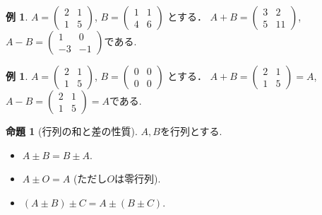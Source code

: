 \documentclass[dvipdfmx,a4paper,11pt]{article}
\theoremstyle{definition}
\newtheorem{prop}[thm]{命題}
\newtheorem{exa}[thm]{例}
\begin{document}
\begin{exa}
 $A = 
 \begin{pmatrix}
 2&1 \\
 1&5
 \end{pmatrix}
 $, 
 $
 B = 
 \begin{pmatrix}
 1&1\\
 4&6
 \end{pmatrix}
 $
 とする．
$
 A+B =
 \begin{pmatrix}
 3&2 \\
5&11
 \end{pmatrix}
 $, 
 $
  A-B =
 \begin{pmatrix}
 1&0\\
 -3&-1
 \end{pmatrix}
 $である.
 \end{exa}
 
 \begin{exa}
 $A = 
 \begin{pmatrix}
 2&1 \\
 1&5
 \end{pmatrix}
 $, 
 $
 B = 
 \begin{pmatrix}
 0&0\\
 0&0
 \end{pmatrix}
 $
 とする． 
$
 A+B =
 \begin{pmatrix}
 2&1 \\
 1&5
 \end{pmatrix}
 =A
 $, 
 $
  A-B =
 \begin{pmatrix}
 2&1 \\
 1&5
 \end{pmatrix}
 =
 A
 $である.
 \end{exa}


 
 \begin{tcolorbox}[
    colback = white,
    colframe = green!35!black,
    fonttitle = \bfseries,
    breakable = true]
    \begin{prop}[行列の和と差の性質]
$A, B$を行列とする.
 \begin{itemize}
 	\setlength{\parskip}{0cm}
  	\setlength{\itemsep}{0pt} 
 \item $A\pm B =B\pm A$.
  \item $A\pm O =A$ (ただし$O$は零行列).
  \item $(A \pm B) \pm C =A \pm  (B\pm C)$.
 \end{itemize}
  \end{prop}
 \end{tcolorbox}
 
\end{document}
